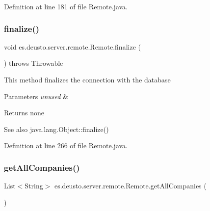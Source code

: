 Definition at line 181 of file Remote.\+java.

\mbox{\label{classes_1_1deusto_1_1server_1_1remote_1_1_remote_ac8c5c24cdafa413da4ad7d71f7f710d3}} 
\subsubsection{\texorpdfstring{finalize()}{finalize()}}
{\footnotesize\ttfamily void es.\+deusto.\+server.\+remote.\+Remote.\+finalize (\begin{DoxyParamCaption}{ }\end{DoxyParamCaption}) throws Throwable\hspace{0.3cm}{\ttfamily [protected]}}

This method finalizes the connection with the database 
\begin{DoxyParams}{Parameters}
{\em unused} & \\
\hline
\end{DoxyParams}
\begin{DoxyReturn}{Returns}
none 
\end{DoxyReturn}
\begin{DoxySeeAlso}{See also}
java.\+lang.\+Object\+::finalize() 
\end{DoxySeeAlso}


Definition at line 266 of file Remote.\+java.

\mbox{\label{classes_1_1deusto_1_1server_1_1remote_1_1_remote_aab476fc9723873e8f85296602d34a97a}} 
\subsubsection{\texorpdfstring{get\+All\+Companies()}{getAllCompanies()}}
{\footnotesize\ttfamily List$<$String$>$ es.\+deusto.\+server.\+remote.\+Remote.\+get\+All\+Companies (\begin{DoxyParamCaption}{ }\end{DoxyParamCaption})}

